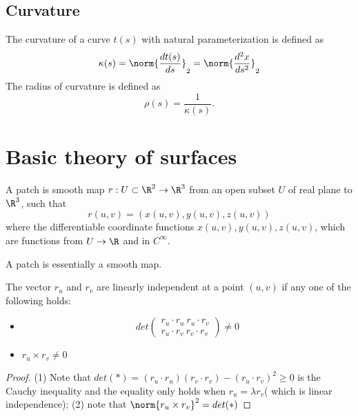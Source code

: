 \begin{refsection}
\subsection{Curvature}
\begin{definition}
The curvature of a curve $t(s)$ with natural parameterization is defined as
$$\kappa(s) = \norm{\frac{dt(s)}{ds}}_2 = \norm{\frac{d^2x}{ds^2}}_2$$
The radius of curvature is defined as
$$\rho(s) = \frac{1}{\kappa(s)}.$$
\end{definition}



\section{Basic theory of surfaces}
\begin{definition}[patch]\cite[134]{krim2015geometric}
A patch is smooth map $r:U\subset \R^2 \to \R^3$ from an open subset $U$ of real plane to $\R^3$, such that 
$$r(u,v) = (x(u,v),y(u,v),z(u,v))$$
where the differentiable coordinate functions $x(u,v),y(u,v),z(u,v)$, which are functions from $U\to \R$ and in $C^{\infty}$. 
\end{definition}

\begin{remark}
A patch is essentially a smooth map.
\end{remark}




\begin{lemma}
The vector $r_u$ and $r_v$ are linearly independent at a point $(u,v)$ if any one of the following holds:
\begin{itemize}
    \item 
    $$ 
    det\begin{pmatrix}
        r_u\cdot r_u ~ r_u\cdot r_v \\
        r_u \cdot r_v ~ r_v \cdot r_v
        \end{pmatrix}
    \neq 0 $$
    \item $r_u\times r_v \neq 0$
\end{itemize}
\end{lemma}
\begin{proof}
(1) Note that $det(*) = (r_u\cdot r_u)(r_v\cdot r_v) - (r_u\cdot r_v)^2 \geq 0$ is the Cauchy inequality and the equality only holds when $r_u=\lambda r_v$( which is linear independence); (2) note that $\norm{r_u\times r_v}^2 = det(*)$ 
\end{proof}






\end{refsection}
